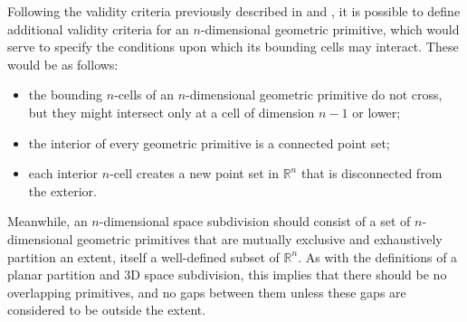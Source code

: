 
Following the validity criteria previously described in  and , it is possible to define additional validity criteria for an $n$-dimensional geometric primitive, which would serve to specify the conditions upon which its bounding cells may interact.
These would be as follows:

\begin{itemize}
\item the bounding $n$-cells of an $n$-dimensional geometric primitive do not cross, but they might intersect only at a cell of dimension $n-1$ or lower;
\item the interior of every geometric primitive is a connected point set;
\item each interior $n$-cell creates a new point set in $\mathbb{R}^n$ that is disconnected from the exterior.
\end{itemize}

Meanwhile, an $n$-dimensional space subdivision should consist of a set of $n$-dimensional geometric primitives that are mutually exclusive and exhaustively partition an extent, itself a well-defined subset of $\mathbb{R}^n$.
As with the definitions of a planar partition and 3D space subdivision, this implies that there should be no overlapping primitives, and no gaps between them unless these gaps are considered to be outside the extent.
